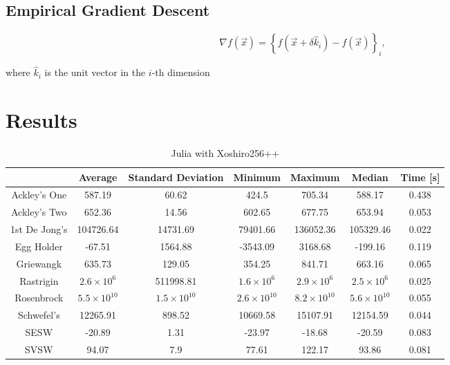 \documentclass{article}
\begin{document}
        \subsection{Empirical Gradient Descent}

            \begin{equation}
                \nabla f(\vec{x}) = \left\{f\left(\vec{x} + \delta \hat{k}_i\right) - f\left(\vec{x}\right)\right\}_i,
            \end{equation}

            where $\hat{k}_i$ is the unit vector in the $i$-th dimension

    \section{Results}

        \begin{table}[h]
        \begin{centering}
            \begin{tabular}{|c||c|c|c|c|c|c|}
                \hline
                            & Average & Standard Deviation & Minimum & Maximum & Median & Time [s] \\
                \hline
                \hline
                Ackley's One & 587.19 & 60.62 & 424.5 & 705.34 & 588.17 & 0.438 \\
                \hline
                Ackley's Two & 652.36 & 14.56 & 602.65 & 677.75 & 653.94 & 0.053 \\
                \hline
                1st De Jong's & 104726.64 & 14731.69 & 79401.66 & 136052.36 & 105329.46 & 0.022 \\
                \hline
                Egg Holder & -67.51 & 1564.88 & -3543.09 & 3168.68 & -199.16 & 0.119 \\
                \hline
                Griewangk & 635.73 & 129.05 & 354.25 & 841.71 & 663.16 & 0.065 \\
                \hline
                Rastrigin & $2.6 \times 10^{6}$ & 511998.81 & $1.6 \times 10^6$ & $2.9 \times 10^6$ & $2.5 \times 10^6$ & 0.025 \\
                \hline
                Rosenbrock & $5.5 \times 10^{10}$ & $1.5 \times 10^{10}$ & $2.6 \times 10^{10}$ & $8.2 \times 10^{10}$ & $5.6 \times 10^{10}$ & 0.055 \\
                \hline
                Schwefel's & 12265.91 & 898.52 & 10669.58 & 15107.91 & 12154.59 & 0.044 \\
                \hline
                SESW & -20.89 & 1.31 & -23.97 & -18.68 & -20.59 & 0.083 \\
                \hline
                SVSW & 94.07 & 7.9 & 77.61 & 122.17 & 93.86 & 0.081 \\
                \hline
            \end{tabular}
            \caption{Julia with Xoshiro256++}
        \end{centering}
        \end{table}
\end{document}
